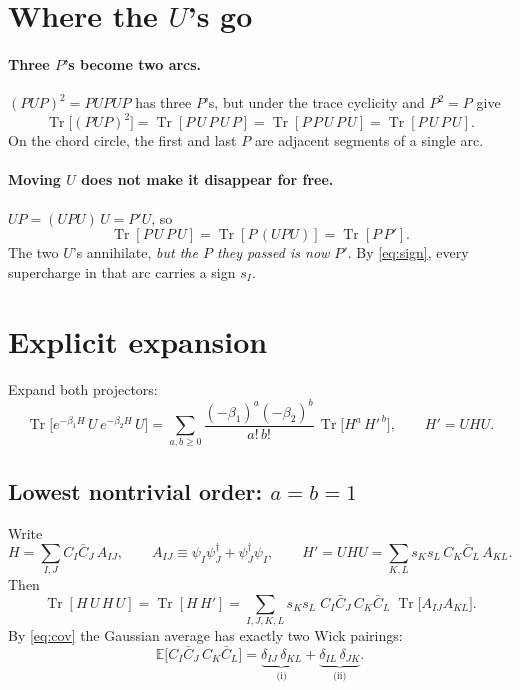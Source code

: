 \documentclass[11pt]{article}
\newcommand{\Tr}{\operatorname{Tr}}
\begin{document}
\section{Where the $U$'s go}
\paragraph{Three $P$'s become two arcs.} $(PUP)^2=PUPUP$ has three $P$'s, but under the trace cyclicity and $P^2=P$ give
\begin{equation}
\Tr\big[(PUP)^2\big]=\Tr[P\,U\,P\,U\,P]=\Tr[P\,P\,U\,P\,U]=\Tr[P\,U\,P\,U].
\end{equation}
On the chord circle, the first and last $P$ are adjacent segments of a single arc.

\paragraph{Moving $U$ does not make it disappear for free.} $UP=(UPU)\,U=P'U$, so
\begin{equation}
\Tr[P\,U\,P\,U]=\Tr[P\,(UPU)]=\Tr[P\,P'].
\end{equation}
The two $U$'s annihilate, \emph{but the $P$ they passed is now $P'$}. By \eqref{eq:sign}, every supercharge in that arc
carries a sign $s_I$.

\section{Explicit expansion}
Expand both projectors:
\begin{equation}
\Tr\big[e^{-\beta_1H}\,U\,e^{-\beta_2H}\,U\big]=\sum_{a,b\ge0}\frac{(-\beta_1)^a(-\beta_2)^b}{a!\,b!}\,\Tr\big[H^a\,H'^{\,b}\big],
\qquad H'=UHU .
\end{equation}

\subsection*{Lowest nontrivial order: $a=b=1$}
Write
\begin{equation}
H=\sum_{I,J}C_I\bar C_J\,A_{IJ},\qquad A_{IJ}\equiv\psi_I\psi_J^\dagger+\psi_J^\dagger\psi_I,
\qquad
H'=UHU=\sum_{K,L}s_Ks_L\,C_K\bar C_L\,A_{KL}.
\end{equation}
Then
\begin{equation}
\Tr[H\,U\,H\,U]=\Tr[H\,H']=\sum_{I,J,K,L}s_Ks_L\;C_I\bar C_J\,C_K\bar C_L\;\Tr\big[A_{IJ}A_{KL}\big].
\end{equation}
By \eqref{eq:cov} the Gaussian average has exactly two Wick pairings:
\begin{equation}
\mathbb E\big[C_I\bar C_J\,C_K\bar C_L\big]=\underbrace{\delta_{IJ}\,\delta_{KL}}_{\text{(i)}}+\underbrace{\delta_{IL}\,\delta_{JK}}_{\text{(ii)}} .
\end{equation}
\end{document}
